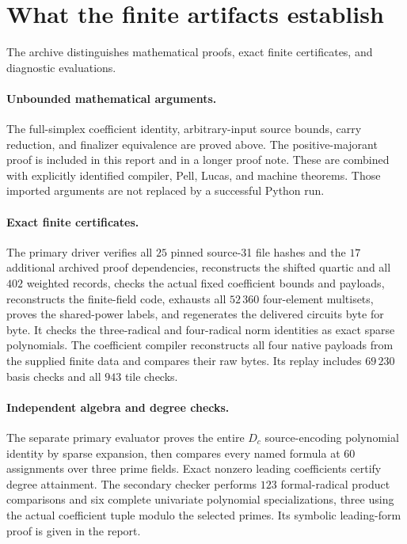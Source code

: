 \documentclass[11pt,letterpaper]{article}
\theoremstyle{remark}
\begin{document}


\section{What the finite artifacts establish}
\label{sec:verification}

The archive distinguishes mathematical proofs, exact finite
certificates, and diagnostic evaluations.

\paragraph{Unbounded mathematical arguments.}
The full-simplex coefficient identity, arbitrary-input source bounds,
carry reduction, and finalizer equivalence are proved above. The
positive-majorant proof is included in this report and in a longer
proof note. These are combined with explicitly identified compiler,
Pell, Lucas, and machine theorems. Those imported arguments are not
replaced by a successful Python run.

\paragraph{Exact finite certificates.}
The primary driver verifies all \(25\) pinned source-31 file hashes and
the \(17\) additional archived proof dependencies,
reconstructs the shifted quartic and all \(402\) weighted records,
checks the actual fixed coefficient bounds and payloads, reconstructs
the finite-field code, exhausts all \(52\,360\) four-element multisets,
proves the shared-power labels, and regenerates the delivered circuits
byte for byte. It checks the three-radical and four-radical norm
identities as exact sparse polynomials. The coefficient compiler
reconstructs all four native payloads from the supplied finite data
and compares their raw bytes. Its replay includes \(69\,230\) basis
checks and all \(943\) tile checks.

\paragraph{Independent algebra and degree checks.}
The separate primary evaluator proves the entire \(D_c\) source-encoding
polynomial identity by sparse expansion, then compares every named
formula at \(60\) assignments over three prime fields. Exact
nonzero leading coefficients certify degree attainment.
The secondary checker performs \(123\) formal-radical product
comparisons and six complete univariate polynomial specializations,
three using the actual coefficient tuple modulo the selected primes.
Its symbolic leading-form proof is given in the report.
\end{document}
